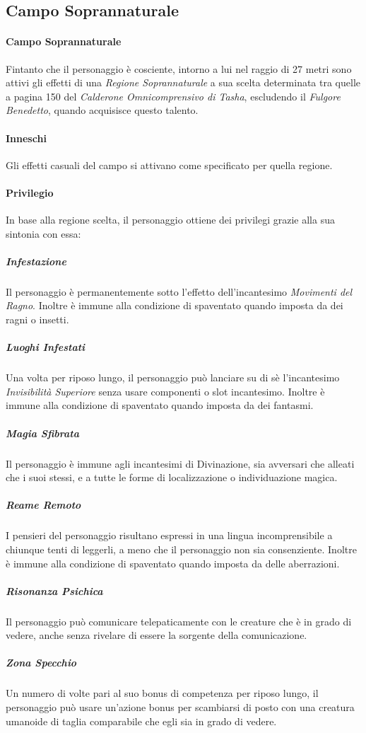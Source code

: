 
\subsection{Campo Soprannaturale}
\paragraph{Campo Soprannaturale} Fintanto che il personaggio è cosciente, intorno a lui nel raggio di 27 metri sono attivi gli effetti di una \textit{Regione Soprannaturale} a sua scelta determinata tra quelle a pagina 150 del \textit{Calderone Omnicomprensivo di Tasha}, escludendo il \textit{Fulgore Benedetto}, quando acquisisce questo talento.
\paragraph{Inneschi} Gli effetti casuali del campo si attivano come specificato per quella regione.
\paragraph{Privilegio} In base alla regione scelta, il personaggio ottiene dei privilegi grazie alla sua sintonia con essa:
\subparagraph*{Infestazione} Il personaggio è permanentemente sotto l'effetto dell'incantesimo \textit{Movimenti del Ragno}. Inoltre è immune alla condizione di spaventato quando imposta da dei ragni o insetti.\\
\subparagraph*{Luoghi Infestati} Una volta per riposo lungo, il personaggio può lanciare su di sè l'incantesimo \textit{Invisibilità Superiore} senza usare componenti o slot incantesimo. Inoltre è immune alla condizione di spaventato quando imposta da dei fantasmi.\\
\subparagraph*{Magia Sfibrata} Il personaggio è immune agli incantesimi di Divinazione, sia avversari che alleati che i suoi stessi, e a tutte le forme di localizzazione o individuazione magica.\\
\subparagraph{Reame Remoto} I pensieri del personaggio risultano espressi in una lingua incomprensibile a chiunque tenti di leggerli, a meno che il personaggio non sia consenziente. Inoltre è immune alla condizione di spaventato quando imposta da delle aberrazioni.\\
\subparagraph*{Risonanza Psichica} Il personaggio può comunicare telepaticamente con le creature che è in grado di vedere, anche senza rivelare di essere la sorgente della comunicazione.\\
\subparagraph*{Zona Specchio} Un numero di volte pari al suo bonus di competenza per riposo lungo, il personaggio può usare un'azione bonus per scambiarsi di posto con una creatura umanoide di taglia comparabile che egli sia in grado di vedere.\\
